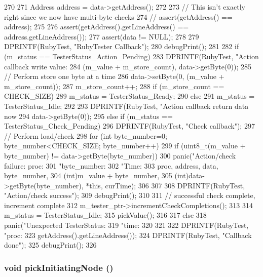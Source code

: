 \begin{DoxyCode}
270 {
271     Address address = data->getAddress();
272 
273     // This isn't exactly right since we now have multi-byte checks
274     //  assert(getAddress() == address);
275 
276     assert(getAddress().getLineAddress() == address.getLineAddress());
277     assert(data != NULL);
278 
279     DPRINTF(RubyTest, "RubyTester Callback\n");
280     debugPrint();
281 
282     if (m_status == TesterStatus_Action_Pending) {
283         DPRINTF(RubyTest, "Action callback write value: %
284                 (m_value + m_store_count), data->getByte(0));
285         // Perform store one byte at a time
286         data->setByte(0, (m_value + m_store_count));
287         m_store_count++;
288         if (m_store_count == CHECK_SIZE) {
289             m_status = TesterStatus_Ready;
290         } else {
291             m_status = TesterStatus_Idle;
292         }
293         DPRINTF(RubyTest, "Action callback return data now %
294                 data->getByte(0));
295     } else if (m_status == TesterStatus_Check_Pending) {
296         DPRINTF(RubyTest, "Check callback\n");
297         // Perform load/check
298         for (int byte_number=0; byte_number<CHECK_SIZE; byte_number++) {
299             if (uint8_t(m_value + byte_number) != data->getByte(byte_number)) {
300                 panic("Action/check failure: proc: %
301                       "byte_number: %
302                       "Time: %
303                       proc, address, data, byte_number,
304                       (int)m_value + byte_number,
305                       (int)data->getByte(byte_number), *this, curTime);
306             }
307         }
308         DPRINTF(RubyTest, "Action/check success\n");
309         debugPrint();
310 
311         // successful check complete, increment complete
312         m_tester_ptr->incrementCheckCompletions();
313 
314         m_status = TesterStatus_Idle;
315         pickValue();
316 
317     } else {
318         panic("Unexpected TesterStatus: %
319               "time: %
320     }
321 
322     DPRINTF(RubyTest, "proc: %
323             getAddress().getLineAddress());
324     DPRINTF(RubyTest, "Callback done\n");
325     debugPrint();
326 }
\end{DoxyCode}
\hypertarget{classCheck_ac935b7ff21b8b1f5dc3009785ec29e9b}{
\subsubsection[{pickInitiatingNode}]{\setlength{\rightskip}{0pt plus 5cm}void pickInitiatingNode ()}}
\label{classCheck_ac935b7ff21b8b1f5dc3009785ec29e9b}




